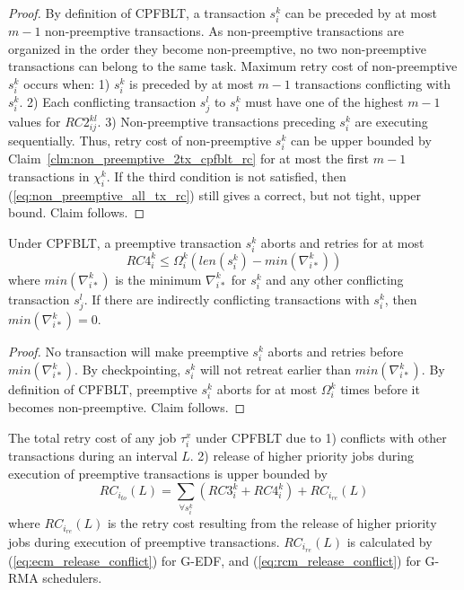 %
\begin{proof}
By definition of CPFBLT, a transaction $s_i^k$ can be preceded by at most $m-1$ non-preemptive transactions. As non-preemptive transactions are organized in the order they become non-preemptive, no two non-preemptive transactions can belong to the same task. Maximum retry cost of non-preemptive $s_i^k$ occurs when: 1) $s_i^k$ is preceded by at most $m-1$ transactions conflicting with $s_i^k$. 2) Each conflicting transaction $s_j^l$ to $s_i^k$ must have one of the highest $m-1$ values for $RC2_{ij}^{kl}$. 3) Non-preemptive transactions preceding $s_i^k$ are executing sequentially. Thus, retry cost of non-preemptive $s_i^k$ can be upper bounded by Claim~\ref{clm:non_preemptive_2tx_cpfblt_rc} for at most the first $m-1$ transactions in $\chi_i^k$. If the third condition is not satisfied, then (\ref{eq:non_preemptive_all_tx_rc}) still gives a correct, but not tight, upper bound. Claim follows.
\end{proof}
%
\begin{clm}\label{clm:delta_ik_rc}
%
Under CPFBLT, a preemptive transaction $s_i^k$ aborts and retries for at most
\begin{equation}
RC4_i^k \le \Omega_i^k \left(len\left(s_i^k\right)-min\left(\nabla_{i*}^k\right)\right)
\label{eq:delta_ik_rc}
\end{equation}
%
where $min\left(\nabla_{i*}^k\right)$ is the minimum $\nabla_{i*}^k$ for $s_i^k$ and any other conflicting transaction $s_j^l$. If there are indirectly conflicting transactions with $s_i^k$, then $min\left(\nabla_{i*}^k\right)=0$.
%
\end{clm}
%
\begin{proof}
%
No transaction will make preemptive $s_i^k$ aborts and retries before $min\left(\nabla_{i*}^k\right)$. By checkpointing, $s_i^k$ will not retreat earlier than $min\left(\nabla_{i*}^k\right)$. By definition of CPFBLT, preemptive $s_i^k$ aborts for at most $\Omega_i^k$ times before it becomes non-preemptive. Claim follows.
\end{proof}
%
\begin{clm}\label{clm:closed_nested_fblt_final}
%
The total retry cost of any job $\tau_i^x$ under CPFBLT due to 1) conflicts with other transactions during an interval $L$. 2) release of higher priority jobs during execution of preemptive transactions is upper bounded by
%
\begin{equation}
RC_{i_{to}}(L)=\sum_{\forall s_i^k} \left(RC3_i^k + RC4_i^k \right) + RC_{i_{re}}(L)
\label{eq:cpfblt_final}
\end{equation}
where $RC_{i_{re}}(L)$ is the retry cost resulting from the release of higher priority jobs during execution of preemptive transactions. $RC_{i_{re}}(L)$ is calculated by (\ref{eq:ecm_release_conflict}) for G-EDF, and (\ref{eq:rcm_release_conflict}) for G-RMA schedulers.
%
\end{clm}
